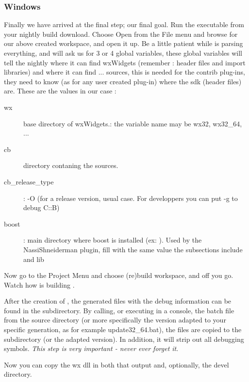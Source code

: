 \subsubsection{Windows}

Finally we have arrived at the final step; our final goal. Run the \codeblocks executable from your nightly build download. Choose Open from the File menu and browse for our above created workspace, and open it up. Be a little patient while \codeblocks is parsing everything, and \codeblocks will ask us for 3 or 4 global variables, these global variables will tell the nightly \codeblocks where it can find wxWidgets (remember : header files and import libraries) and where it can find ... \codeblocks sources, this is needed for the contrib plug-ins, they need to know (as for any user created plug-in) where the sdk (\codeblocks header files) are. These are the values in our case : 
\begin{description}
\item[wx]  base directory of wxWidgets.: the variable name may be wx32, wx32\_64, ...
\item[cb]  \codeblocks directory contaning the sources.
\item[cb\_release\_type] : -O (for a release version, usual case.
         For developpers you can put -g to debug C::B)
\item[boost] : main directory where boost is installed (ex: ).
         Used by the NassiShneiderman plugin,
         fill with the same value the subsections include and lib
\end{description}

Now go to the Project Menu and choose (re)build workspace, and off you go. Watch how \codeblocks is building \codeblocks.

After the creation of \codeblocks, the generated files with the debug information can be found in the  subdirectory. By calling, or executing in a console, the batch file  from the source directory  (or more specifically the version adapted to your specific generation, as for example update32\_64.bat), the files are copied to the  subdirectory (or the adapted version). In addition, it will strip out all debugging symbols. \textit{This step is very important - never ever forget it}.

Now you can copy the wx dll in both that output and, optionally, the devel directory.

